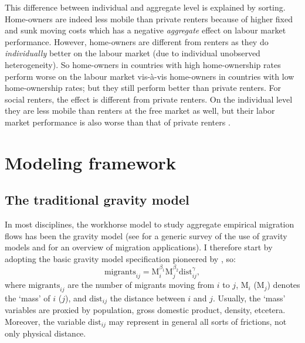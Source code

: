 \documentclass[fleqn,10pt]{SelfArx} %
\begin{document}
This difference between individual and aggregate level is explained by sorting.
Home-owners are indeed less mobile than private renters because of higher fixed
and sunk moving costs which has a negative \emph{aggregate} effect on labour
market performance. However, home-owners are different from renters as they do
\emph{individually} better on the labour market (due to individual unobserved
heterogeneity). So home-owners in countries with high home-ownership rates
perform worse on the labour market vis-\`a-vis home-owners in countries with low
home-ownership rates; but they still perform better than private renters. For
social renters, the effect is different from private renters. On the individual
level they are less mobile than renters at the free market as well, but their
labor market performance is also worse than that of private renters
\citep{hughes1981council, de2009homeownership}.

\section{Modeling framework}

\subsection{The traditional gravity model}

In most disciplines, the workhorse model to study aggregate empirical migration
flows has been the gravity model (see \citet{anderson2011gravity} for a generic
survey of the use of gravity models and \citet{poot2016gravity} for an overview
of migration applications). I therefore start by adopting the basic gravity
model specification pioneered by \citet{tinbergen1962shaping}, so:
\begin{equation}
  \text{migrants}_{ij} = \text{M}_i^{\beta_1}\text{M}_j^{\beta_2}\text{dist}_{ij}^\gamma,
  \label{eq:grav}
\end{equation}
where $\text{migrants}_{ij}$ are the number of migrants moving from $i$ to $j$,
$\text{M}_i$ ($\text{M}_j$) denotes the `mass' of $i$ ($j$), and
$\text{dist}_{ij}$ the distance between $i$ and $j$. Usually, the `mass'
variables are proxied by population, gross domestic product, density, etcetera.
Moreover, the variable $\text{dist}_{ij}$ may represent in general all sorts of
frictions, not only physical distance.
\end{document}
